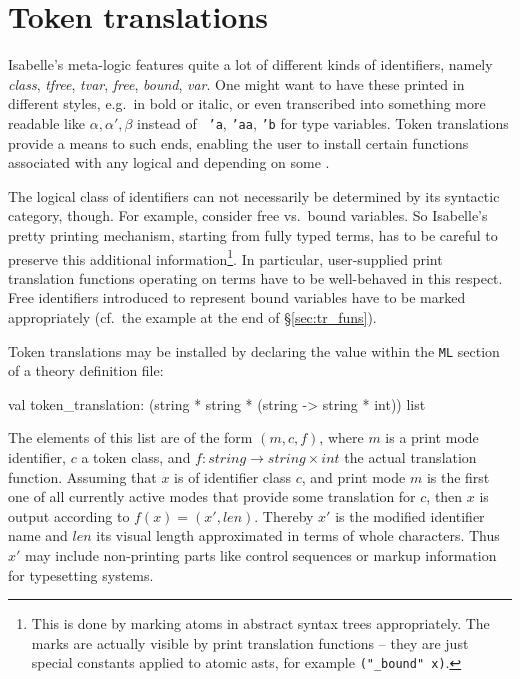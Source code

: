 \section{Token translations} \label{sec:tok_tr}
%
Isabelle's meta-logic features quite a lot of different kinds of
identifiers, namely {\em class}, {\em tfree}, {\em tvar}, {\em free},
{\em bound}, {\em var}.  One might want to have these printed in
different styles, e.g.\ in bold or italic, or even transcribed into
something more readable like $\alpha, \alpha', \beta$ instead of {\tt
  'a}, {\tt 'aa}, {\tt 'b} for type variables.  Token translations
provide a means to such ends, enabling the user to install certain
\ML{} functions associated with any logical  and
depending on some .

The logical class of identifiers can not necessarily be determined by
its syntactic category, though.  For example, consider free vs.\ bound
variables.  So Isabelle's pretty printing mechanism, starting from
fully typed terms, has to be careful to preserve this additional
information\footnote{This is done by marking atoms in abstract syntax
  trees appropriately.  The marks are actually visible by print
  translation functions -- they are just special constants applied to
  atomic asts, for example \texttt{("_bound" x)}.}.  In particular,
user-supplied print translation functions operating on terms have to
be well-behaved in this respect.  Free identifiers introduced to
represent bound variables have to be marked appropriately (cf.\ the
example at the end of \S\ref{sec:tr_funs}).

\medskip Token translations may be installed by declaring the
 value within the \texttt{ML} section of a
theory definition file:
\begin{ttbox}
val token_translation: (string * string * (string -> string * int)) list
\end{ttbox}
The elements of this list are of the form $(m, c, f)$, where $m$ is a
print mode identifier, $c$ a token class, and $f\colon string \to
string \times int$ the actual translation function.  Assuming that $x$
is of identifier class $c$, and print mode $m$ is the first one of all
currently active modes that provide some translation for $c$, then $x$
is output according to $f(x) = (x', len)$.  Thereby $x'$ is the
modified identifier name and $len$ its visual length approximated in
terms of whole characters.  Thus $x'$ may include non-printing parts
like control sequences or markup information for typesetting systems.


